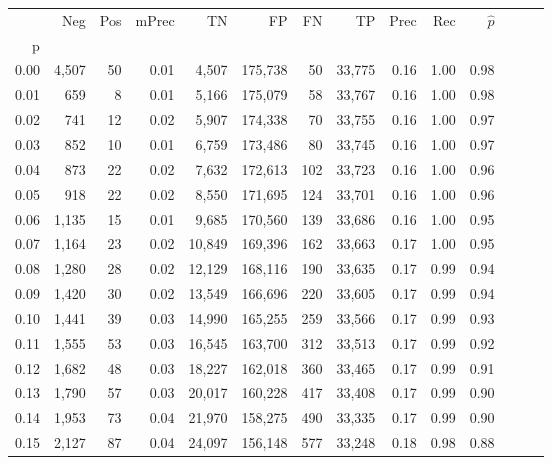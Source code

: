 \begin{tabular}{rrrrrrrrrrrrrr}
\toprule
{} &    Neg &  Pos & mPrec &       TN &       FP &      FN &      TP &  Prec &   Rec & $\hat{p}$ \\
p    &        &      &       &          &          &         &         &       &       &           \\
\midrule
0.00 &  4,507 &   50 &  0.01 &    4,507 &  175,738 &      50 &  33,775 &  0.16 &  1.00 &      0.98 \\
0.01 &    659 &    8 &  0.01 &    5,166 &  175,079 &      58 &  33,767 &  0.16 &  1.00 &      0.98 \\
0.02 &    741 &   12 &  0.02 &    5,907 &  174,338 &      70 &  33,755 &  0.16 &  1.00 &      0.97 \\
0.03 &    852 &   10 &  0.01 &    6,759 &  173,486 &      80 &  33,745 &  0.16 &  1.00 &      0.97 \\
0.04 &    873 &   22 &  0.02 &    7,632 &  172,613 &     102 &  33,723 &  0.16 &  1.00 &      0.96 \\
0.05 &    918 &   22 &  0.02 &    8,550 &  171,695 &     124 &  33,701 &  0.16 &  1.00 &      0.96 \\
0.06 &  1,135 &   15 &  0.01 &    9,685 &  170,560 &     139 &  33,686 &  0.16 &  1.00 &      0.95 \\
0.07 &  1,164 &   23 &  0.02 &   10,849 &  169,396 &     162 &  33,663 &  0.17 &  1.00 &      0.95 \\
0.08 &  1,280 &   28 &  0.02 &   12,129 &  168,116 &     190 &  33,635 &  0.17 &  0.99 &      0.94 \\
0.09 &  1,420 &   30 &  0.02 &   13,549 &  166,696 &     220 &  33,605 &  0.17 &  0.99 &      0.94 \\
0.10 &  1,441 &   39 &  0.03 &   14,990 &  165,255 &     259 &  33,566 &  0.17 &  0.99 &      0.93 \\
0.11 &  1,555 &   53 &  0.03 &   16,545 &  163,700 &     312 &  33,513 &  0.17 &  0.99 &      0.92 \\
0.12 &  1,682 &   48 &  0.03 &   18,227 &  162,018 &     360 &  33,465 &  0.17 &  0.99 &      0.91 \\
0.13 &  1,790 &   57 &  0.03 &   20,017 &  160,228 &     417 &  33,408 &  0.17 &  0.99 &      0.90 \\
0.14 &  1,953 &   73 &  0.04 &   21,970 &  158,275 &     490 &  33,335 &  0.17 &  0.99 &      0.90 \\
0.15 &  2,127 &   87 &  0.04 &   24,097 &  156,148 &     577 &  33,248 &  0.18 &  0.98 &      0.88 \\

\end{tabular}
